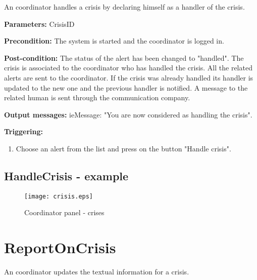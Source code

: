 An coordinator handles a crisis by declaring himself as a handler of the crisis.

\begin{description}
	\item \textbf{Parameters:} CrisisID 
	\item \textbf{Precondition:} The system is started and the coordinator is
	logged in.
	\item \textbf{Post-condition:} The status of the alert has been changed to
	"handled". The crisis is associated to the coordinator who has handled the crisis.
	All the related alerts are sent to the coordinator. If the crisis was already
	handled its handler is updated to the new one and the previous handler is
	notified. A message to the related human is sent through the communication
	company.
	\item \textbf{Output messages:} ieMessage: "You are now considered as handling
	the crisis".
	
	\item \textbf{Triggering:}
	
	\begin{enumerate}
		\item Choose an alert from the list and press on the button "Handle crisis".
	\end{enumerate}
\end{description}

\subsection{HandleCrisis - example}

\begin{figure}
    \texttt{[image: crisis.eps]}
	\caption{Coordinator panel - crises}
\end{figure}

\section{ReportOnCrisis}
\label{operation:ReportOnCrisis}

An coordinator updates the textual information for a crisis.

